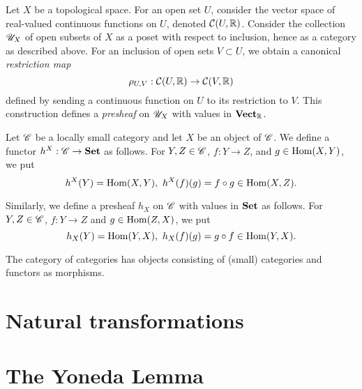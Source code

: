 \begin{example}
  Let $X$ be a topological space.
  For an open set $U$, consider the vector space of real-valued continuous functions on $U$, denoted $\mathcal{C}(U,\mathbb{R})$.
  Consider the collection $\mathscr{U}_{X}$ of open subsets of $X$ as a poset with respect to inclusion, hence as a category as described above.
  For an inclusion of open sets $V \subset U$, we obtain a canonical \emph{restriction map}
  \[ \rho_{U,V}: \mathcal{C}(U,\mathbb{R}) \to \mathcal{C}(V,\mathbb{R}) \]
  defined by sending a continuous function on $U$ to its restriction to $V$.
  This construction defines a \emph{presheaf} on $\mathscr{U}_{X}$ with values in $\mathbf{Vect}_{\mathbb{R}}$.
\end{example}

\begin{example}
  Let $\mathscr{C}$ be a locally small category and let $X$ be an object of $\mathscr{C}$.
  We define a functor $h^{X} : \mathscr{C} \to \mathbf{Set}$ as follows.
  For $Y, Z \in \mathscr{C}$, $f : Y \to Z$, and $g \in \operatorname{Hom}(X,Y)$, we put
  \[ h^{X}(Y) = \operatorname{Hom}(X,Y), \ h^{X}(f)(g) = f \circ g \in \operatorname{Hom}(X,Z). \]

  Similarly, we define a presheaf $h_{X}$ on $\mathscr{C}$ with values in $\mathbf{Set}$ as follows.
  For $Y,Z \in \mathscr{C}$, $f : Y \to Z$ and $g \in \operatorname{Hom}(Z,X)$, we put
  \[ h_{X}(Y) = \operatorname{Hom}(Y,X), \ h_{X}(f)(g) = g \circ f \in \operatorname{Hom}(Y,X). \]
\end{example}

\begin{example}
  The category of categories has objects consisting of (small) categories and functors as morphisms.
\end{example}

\section{Natural transformations}


\section{The Yoneda Lemma}


